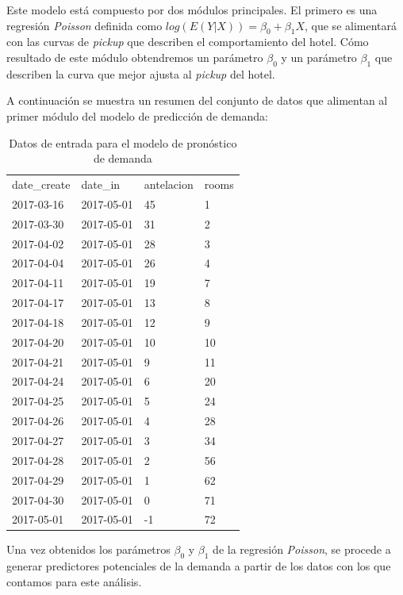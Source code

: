Este modelo está compuesto por dos módulos principales. El primero es una regresión \emph{Poisson} definida como $log(E(Y|X)) = \beta_0 + \beta_1X$, que se alimentará con las curvas de \emph{pickup} que describen el comportamiento del hotel. Cómo resultado de este módulo obtendremos un parámetro $\beta_0$ y un parámetro $\beta_1$ que describen la curva que mejor ajusta al \emph{pickup} del hotel.

A continuación se muestra un resumen del conjunto de datos que alimentan al primer módulo del modelo de predicción de demanda:

\begin{table}[H]
\centering
\begin{tabular}{llll}
date\_create & date\_in   & antelacion & rooms \\
2017-03-16   & 2017-05-01 & 45         & 1     \\
2017-03-30   & 2017-05-01 & 31         & 2     \\
2017-04-02   & 2017-05-01 & 28         & 3     \\
2017-04-04   & 2017-05-01 & 26         & 4     \\
2017-04-11   & 2017-05-01 & 19         & 7     \\
2017-04-17   & 2017-05-01 & 13         & 8     \\
2017-04-18   & 2017-05-01 & 12         & 9     \\
2017-04-20   & 2017-05-01 & 10         & 10    \\
2017-04-21   & 2017-05-01 & 9          & 11    \\
2017-04-24   & 2017-05-01 & 6          & 20    \\
2017-04-25   & 2017-05-01 & 5          & 24    \\
2017-04-26   & 2017-05-01 & 4          & 28    \\
2017-04-27   & 2017-05-01 & 3          & 34    \\
2017-04-28   & 2017-05-01 & 2          & 56    \\
2017-04-29   & 2017-05-01 & 1          & 62    \\
2017-04-30   & 2017-05-01 & 0          & 71    \\
2017-05-01   & 2017-05-01 & -1         & 72    \\
\end{tabular}
\caption{Datos de entrada para el modelo de pronóstico de demanda} 
\end{table}

Una vez obtenidos los parámetros $\beta_0$ y $\beta_1$ de la regresión \emph{Poisson}, se procede a generar predictores potenciales de la demanda a partir de los datos con los que contamos para este análisis.

